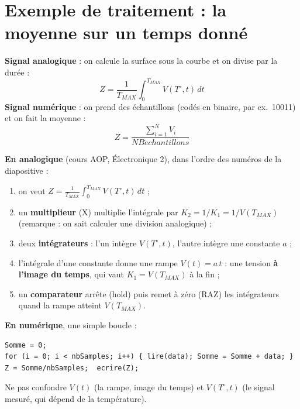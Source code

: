 \section{Exemple de traitement : la moyenne sur un temps donné}


\begin{exbox}[title=Calculer la moyenne d'un signal sur un temps $T_{MAX}$]
\textbf{Signal analogique} : on calcule la surface sous la courbe et on divise par la durée :
\[ Z = \frac{1}{T_{MAX}}\int_0^{T_{MAX}} V(T^\circ, t)\,dt \]
\textbf{Signal numérique} : on prend des échantillons (codés en binaire, par ex.\ 10011) et on
fait la moyenne :
\[ Z = \frac{\sum_{i=1}^{N} V_i}{NB\acute{e}chantillons} \]
\end{exbox}


\begin{exbox}[title=Comment on le réalise]
\textbf{En analogique} (cours AOP, Électronique 2), dans l'ordre des numéros de la
diapositive :
\begin{enumerate}
  \item on veut $Z = \frac{1}{T_{MAX}}\int_0^{T_{MAX}} V(T^\circ,t)\,dt$ ;
  \item un \textbf{multiplieur} (X) multiplie l'intégrale par $K_2 = 1/K_1 = 1/V(T_{MAX})$
        (remarque : on sait calculer une division analogique) ;
  \item deux \textbf{intégrateurs} : l'un intègre $V(T^\circ,t)$, l'autre intègre une
        constante $a$ ;
  \item l'intégrale d'une constante donne une rampe $V(t)=a\,t$ : une tension
        \textbf{à l'image du temps}, qui vaut $K_1 = V(T_{MAX})$ à la fin ;
  \item un \textbf{comparateur} arrête (hold) puis remet à zéro (RAZ) les intégrateurs quand
        la rampe atteint $V(T_{MAX})$.
\end{enumerate}
\textbf{En numérique}, une simple boucle :
\begin{verbatim}
Somme = 0;
for (i = 0; i < nbSamples; i++) { lire(data); Somme = Somme + data; }
Z = Somme/nbSamples;  ecrire(Z);
\end{verbatim}
\end{exbox}

\begin{warnbox}[title=Attention]
Ne pas confondre $V(t)$ (la rampe, image du temps) et $V(T^\circ, t)$ (le signal mesuré, qui
dépend de la température).
\end{warnbox}

